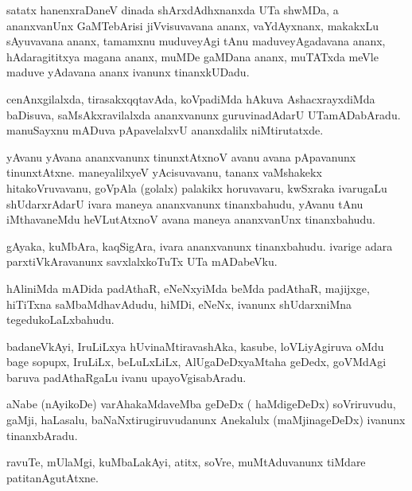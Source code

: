 \documentclass{article}
\begin{document}
\begin{mn}
satatx hanenxraDaneV dinada shArxdAdhxnanxda UTa shwMDa, a ananxvanUnx GaMTebArisi jiVvisuvavana 
ananx, vaYdAyxnanx, makakxLu sAyuvavana ananx, tamamxnu muduveyAgi tAnu maduveyAgadavana ananx, 
hAdaragititxya magana ananx, muMDe gaMDana ananx, muTATxda meVle maduve yAdavana ananx ivanunx 
tinanxkUDadu.
\end{mn}

\begin{mn}
cenAnxgilalxda, tirasakxqqtavAda, koVpadiMda hAkuva AshacxrayxdiMda baDisuva, saMsAkxravilalxda 
ananxvanunx guruvinadAdarU UTamADabAradu. manuSayxnu mADuva pApavelalxvU ananxdalilx niMtirutatxde.
\end{mn}

\begin{mn}
yAvanu yAvana ananxvanunx tinunxtAtxnoV avanu avana pApavanunx tinunxtAtxne. maneyalilxyeV 
yAcisuvavanu, tananx vaMshakekx hitakoVruvavanu, goVpAla (golalx) palakikx horuvavaru, kwSxraka 
ivarugaLu shUdarxrAdarU ivara maneya ananxvanunx tinanxbahudu, yAvanu tAnu iMthavaneMdu 
heVLutAtxnoV avana maneya ananxvanUnx tinanxbahudu.
\end{mn}

\begin{mn}
gAyaka, kuMbAra, kaqSigAra, ivara ananxvanunx tinanxbahudu. ivarige adara parxtiVkAravanunx 
savxlalxkoTuTx UTa mADabeVku.
\end{mn}

\begin{mn}
hAliniMda mADida padAthaR, eNeNxyiMda beMda padAthaR, majijxge, hiTiTxna saMbaMdhavAdudu, hiMDi, 
eNeNx,  ivanunx shUdarxniMna tegedukoLaLxbahudu.
\end{mn}

\begin{mn}
badaneVkAyi, IruLiLxya hUvinaMtiravashAka, kasube, loVLiyAgiruva oMdu bage sopupx, IruLiLx, 
beLuLxLiLx, AlUgaDeDxyaMtaha geDedx, goVMdAgi baruva padAthaRgaLu ivanu upayoVgisabAradu.
\end{mn}

\begin{mn}
aNabe (nAyikoDe) varAhakaMdaveMba geDeDx ( haMdigeDeDx) soVriruvudu, gaMji, haLasalu, 
baNaNxtirugiruvudanunx Anekalulx (maMjinageDeDx) ivanunx tinanxbAradu.
\end{mn}

\begin{mn}
ravuTe, mUlaMgi, kuMbaLakAyi, atitx, soVre, muMtAduvanunx tiMdare patitanAgutAtxne.
\end{mn}
\end{document}
